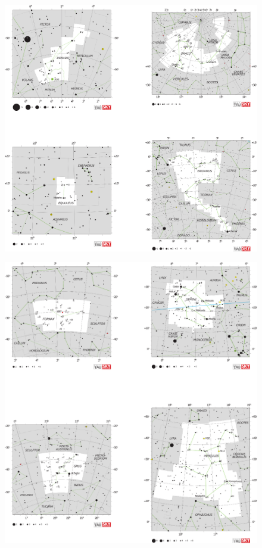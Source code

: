\documentclass[a4paper,12pt]{extarticle}
\begin{document}
\clearpage
\begin{figure}
    \centering
    \includegraphics[width=\linewidth]{C9.eps}
\end{figure}
\clearpage
\begin{figure}
    \centering
    \includegraphics[width=\linewidth]{C10.eps}
\end{figure}
\end{document}
